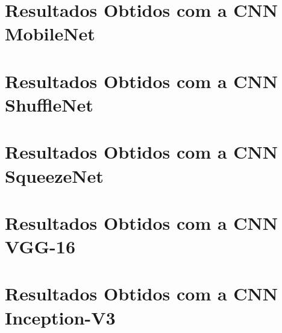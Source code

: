 \section{Resultados Obtidos com a CNN MobileNet}
\label{sec:mobilenet}


\section{Resultados Obtidos com a CNN ShuffleNet}
\label{sec:shufflenet}


\section{Resultados Obtidos com a CNN SqueezeNet}
\label{sec:squeezenet}


\section{Resultados Obtidos com a CNN VGG-16}
\label{sec:vgg}


\section{Resultados Obtidos com a CNN Inception-V3}
\label{sec:inception}
